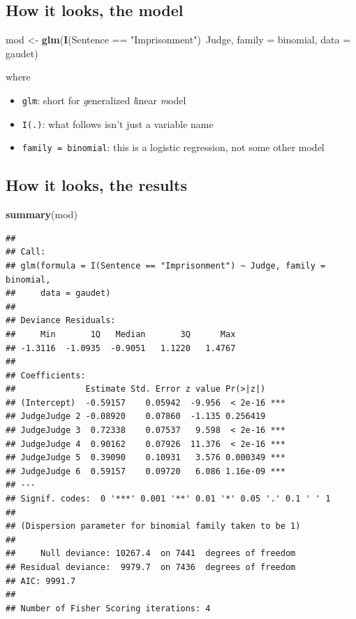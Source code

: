 \documentclass[12pt,twoside]{article}
\newenvironment{Shaded}{}{}
\newcommand{\KeywordTok}[1]{\textcolor[rgb]{0.00,0.44,0.13}{\textbf{{#1}}}}
\newcommand{\DataTypeTok}[1]{\textcolor[rgb]{0.56,0.13,0.00}{{#1}}}
\newcommand{\StringTok}[1]{\textcolor[rgb]{0.25,0.44,0.63}{{#1}}}
\newcommand{\NormalTok}[1]{{#1}}
\providecommand{\tightlist}{%
  \setlength{\itemsep}{0pt}\setlength{\parskip}{0pt}}
\begin{document}
\subsection{How it looks, the model}\label{how-it-looks-the-model}

\begin{Shaded}
\begin{Highlighting}[]
\NormalTok{mod <-}\StringTok{ }\KeywordTok{glm}\NormalTok{(}\KeywordTok{I}\NormalTok{(Sentence ==}\StringTok{ "Imprisonment"}\NormalTok{)~Judge,}
           \DataTypeTok{family =} \NormalTok{binomial,}
           \DataTypeTok{data =} \NormalTok{gaudet)}
\end{Highlighting}
\end{Shaded}

where

\begin{itemize}
\tightlist
\item
  \texttt{glm}: short for \emph{g}eneralized \emph{l}inear \emph{m}odel
\item
  \texttt{I(.)}: what follows isn't just a variable name
\item
  \texttt{family\ =\ binomial}: this is a logistic regression, not some
  other model
\end{itemize}

\subsection{How it looks, the results}\label{how-it-looks-the-results}

\footnotesize

\begin{Shaded}
\begin{Highlighting}[]
\KeywordTok{summary}\NormalTok{(mod)}
\end{Highlighting}
\end{Shaded}

\begin{verbatim}
## 
## Call:
## glm(formula = I(Sentence == "Imprisonment") ~ Judge, family = binomial, 
##     data = gaudet)
## 
## Deviance Residuals: 
##     Min       1Q   Median       3Q      Max  
## -1.3116  -1.0935  -0.9051   1.1220   1.4767  
## 
## Coefficients:
##              Estimate Std. Error z value Pr(>|z|)    
## (Intercept)  -0.59157    0.05942  -9.956  < 2e-16 ***
## JudgeJudge 2 -0.08920    0.07860  -1.135 0.256419    
## JudgeJudge 3  0.72338    0.07537   9.598  < 2e-16 ***
## JudgeJudge 4  0.90162    0.07926  11.376  < 2e-16 ***
## JudgeJudge 5  0.39090    0.10931   3.576 0.000349 ***
## JudgeJudge 6  0.59157    0.09720   6.086 1.16e-09 ***
## ---
## Signif. codes:  0 '***' 0.001 '**' 0.01 '*' 0.05 '.' 0.1 ' ' 1
## 
## (Dispersion parameter for binomial family taken to be 1)
## 
##     Null deviance: 10267.4  on 7441  degrees of freedom
## Residual deviance:  9979.7  on 7436  degrees of freedom
## AIC: 9991.7
## 
## Number of Fisher Scoring iterations: 4
\end{verbatim}
\end{document}
